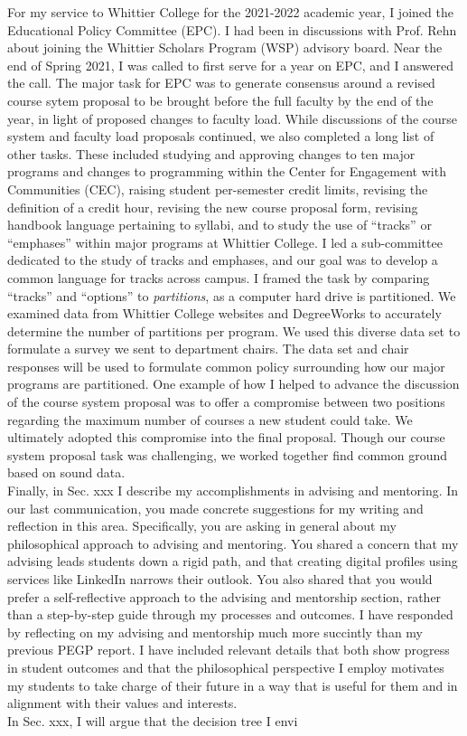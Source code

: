 \documentclass[../../main.tex]{subfiles}
\begin{document}
For my service to Whittier College for the 2021-2022 academic year, I joined the Educational Policy Committee (EPC).  I had been in discussions with Prof. Rehn about joining the Whittier Scholars Program (WSP) advisory board.  Near the end of Spring 2021, I was called to first serve for a year on EPC, and I answered the call.  The major task for EPC was to generate consensus around a revised course sytem proposal to be brought before the full faculty by the end of the year, in light of proposed changes to faculty load.  While discussions of the course system and faculty load proposals continued, we also completed a long list of other tasks.  These included studying and approving changes to ten major programs and changes to programming within the Center for Engagement with Communities (CEC), raising student per-semester credit limits, revising the definition of a credit hour, revising the new course proposal form, revising handbook language pertaining to syllabi, and to study the use of ``tracks'' or ``emphases'' within major programs at Whittier College.  I led a sub-committee dedicated to the study of tracks and emphases, and our goal was to develop a common language for tracks across campus.  I framed the task by comparing ``tracks'' and ``options'' to \textit{partitions}, as a computer hard drive is partitioned.  We examined data from Whittier College websites and DegreeWorks to accurately determine the number of partitions per program.  We used this diverse data set to formulate a survey we sent to department chairs.  The data set and chair responses will be used to formulate common policy surrounding how our major programs are partitioned.  One example of how I helped to advance the discussion of the course system proposal was to offer a compromise between two positions regarding the maximum number of courses a new student could take.  We ultimately adopted this compromise into the final proposal.  Though our course system proposal task was challenging, we worked together find common ground based on sound data.
\\
\vspace{0.25cm}
Finally, in Sec. xxx I describe my accomplishments in advising and mentoring.  In our last communication, you made concrete suggestions for my writing and reflection in this area.  Specifically, you are asking in general about my philosophical approach to advising and mentoring.  You shared a concern that my advising leads students down a rigid path, and that creating digital profiles using services like LinkedIn narrows their outlook.  You also shared that you would prefer a self-reflective approach to the advising and mentorship section, rather than a step-by-step guide through my processes and outcomes.  I have responded by reflecting on my advising and mentorship much more succintly than my previous PEGP report.  I have included relevant details that both show progress in student outcomes and that the philosophical perspective I employ motivates my students to take charge of their future in a way that is useful for them and in alignment with their values and interests.
\\
\vspace{0.25cm}
In Sec. xxx, I will argue that the decision tree I envi
\end{document}
